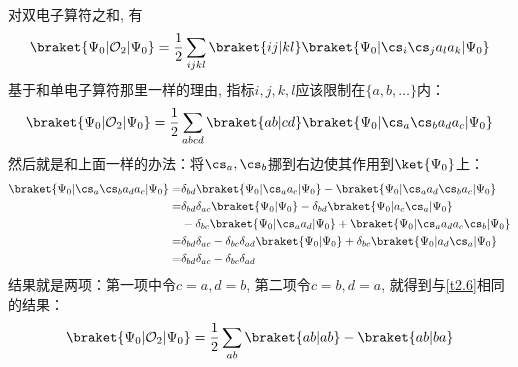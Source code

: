 对双电子算符之和, 
有
\begin{align}
\braket{\Psi_0|\mathcal{O}_2|\Psi_0} = \frac{1}{2}\sum_{ijkl}\braket{ij|kl}\braket{\Psi_0|\cs_i\cs_ja_la_k|\Psi_0}
\end{align}
基于和单电子算符那里一样的理由, 
指标$i,j,k,l$应该限制在$\{a,b,\ldots\}$内：
\begin{align}
\braket{\Psi_0|\mathcal{O}_2|\Psi_0} =\frac{1}{2}\sum_{abcd}\braket{ab|cd}\braket{\Psi_0|\cs_a\cs_ba_da_c|\Psi_0}
\end{align}
然后就是和上面一样的办法：将$\cs_a,\cs_b$挪到右边使其作用到$\ket{\Psi_0}$上：
\begin{align*}
\braket{\Psi_0|\cs_a\cs_ba_da_c|\Psi_0} = & \delta_{bd}\braket{\Psi_0|\cs_a a_c|\Psi_0} - \braket{\Psi_0|\cs_a a_d \cs_b a_c|\Psi_0} \\
= & \delta_{bd}\delta_{ac}\braket{\Psi_0|\Psi_0} - \delta_{bd}\braket{\Psi_0|a_c\cs_a|\Psi_0}\\
& - \delta_{bc}\braket{\Psi_0|\cs_aa_d|\Psi_0} + \braket{\Psi_0|\cs_aa_da_c\cs_b|\Psi_0}\\
= & \delta_{bd}\delta_{ac} - \delta_{bc}\delta_{ad}\braket{\Psi_0|\Psi_{0}} + \delta_{bc}\braket{\Psi_0|a_d\cs_a|\Psi_0}\\
= & \delta_{bd}\delta_{ac} - \delta_{bc}\delta_{ad}
\end{align*}
结果就是两项：第一项中令$c=a,d=b$, 
第二项令$c=b,d=a$, 
就得到与\autoref{t2.6}相同的结果：
\begin{align}
\braket{\Psi_0|\mathcal{O}_2|\Psi_0} = \frac{1}{2}\sum_{ab}\braket{ab|ab} - \braket{ab|ba}
\end{align}
